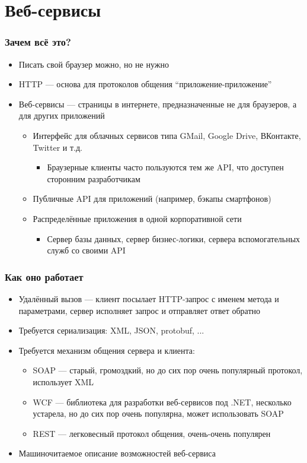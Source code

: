 \documentclass[xetex,mathserif,serif]{beamer}
\begin{document}
	\section{Веб-сервисы}

	\begin{frame}
		\frametitle{Зачем всё это?}
		\begin{itemize}
			\item Писать свой браузер можно, но не нужно
			\item HTTP --- основа для протоколов общения ``приложение-приложение''
			\item Веб-сервисы --- страницы в интернете, предназначенные не для браузеров, а для других приложений
			\begin{itemize}
				\item Интерфейс для облачных сервисов типа GMail, Google Drive, ВКонтакте, Twitter и т.д.
				\begin{itemize}
					\item Браузерные клиенты часто пользуются тем же API, что доступен сторонним разработчикам
				\end{itemize}
				\item Публичные API для приложений (например, бэкапы смартфонов)
				\item Распределённые приложения в одной корпоративной сети
				\begin{itemize}
					\item Сервер базы данных, сервер бизнес-логики, сервера вспомогательных служб со своими API
				\end{itemize}
			\end{itemize}
		\end{itemize}
	\end{frame}

	\begin{frame}
		\frametitle{Как оно работает}
		\begin{itemize}
			\item Удалённый вызов --- клиент посылает HTTP-запрос с именем метода и параметрами, сервер исполняет запрос и отправляет ответ обратно
			\item Требуется сериализация: XML, JSON, protobuf, ...
			\item Требуется механизм общения сервера и клиента:
			\begin{itemize}
				\item SOAP --- старый, громоздкий, но до сих пор очень популярный протокол, использует XML
				\item WCF --- библиотека для разработки веб-сервисов под .NET, несколько устарела, но до сих пор очень популярна, может использовать SOAP
				\item REST --- легковесный протокол общения, очень-очень популярен
			\end{itemize}
			\item Машиночитаемое описание возможностей веб-сервиса
		\end{itemize}
	\end{frame}
\end{document}
